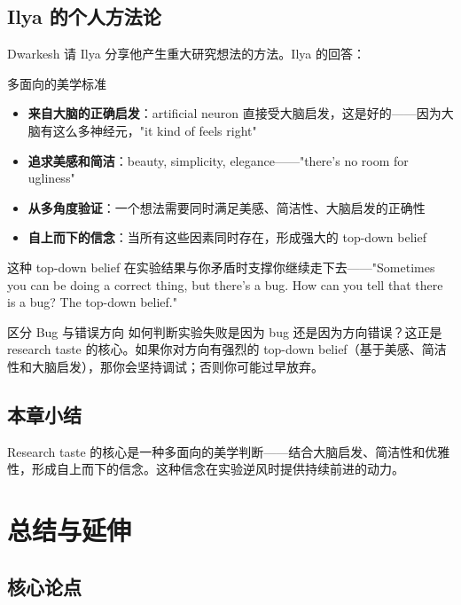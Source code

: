 \documentclass[a4paper]{article}
\begin{document}
\subsection{Ilya 的个人方法论}

Dwarkesh 请 Ilya 分享他产生重大研究想法的方法。Ilya 的回答：

\begin{importantbox}{多面向的美学标准}
\begin{itemize}
    \item \textbf{来自大脑的正确启发}：artificial neuron 直接受大脑启发，这是好的——因为大脑有这么多神经元，"it kind of feels right"
    \item \textbf{追求美感和简洁}：beauty, simplicity, elegance——"there's no room for ugliness"
    \item \textbf{从多角度验证}：一个想法需要同时满足美感、简洁性、大脑启发的正确性
    \item \textbf{自上而下的信念}：当所有这些因素同时存在，形成强大的 top-down belief
\end{itemize}
这种 top-down belief 在实验结果与你矛盾时支撑你继续走下去——"Sometimes you can be doing a correct thing, but there's a bug. How can you tell that there is a bug? The top-down belief."
\end{importantbox}

\begin{knowledgebox}{区分 Bug 与错误方向}
如何判断实验失败是因为 bug 还是因为方向错误？这正是 research taste 的核心。如果你对方向有强烈的 top-down belief（基于美感、简洁性和大脑启发），那你会坚持调试；否则你可能过早放弃。
\end{knowledgebox}

\subsection{本章小结}

Research taste 的核心是一种多面向的美学判断——结合大脑启发、简洁性和优雅性，形成自上而下的信念。这种信念在实验逆风时提供持续前进的动力。


\section{总结与延伸}

\subsection{核心论点}
\end{document}
